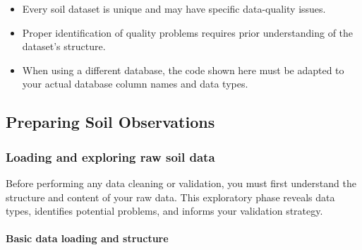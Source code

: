 \documentclass[
  10pt,
  b5paper,
  oneside]{book}
\begin{document}
\begin{itemize}
\item
  Every soil dataset is unique and may have specific data-quality issues.
\item
  Proper identification of quality problems requires prior understanding of the dataset's structure.
\item
  When using a different database, the code shown here must be adapted to your actual database column names and data types.
\end{itemize}

\subsection{Preparing Soil Observations}\label{preparing-soil-observations}

\subsubsection{Loading and exploring raw soil data}\label{loading-and-exploring-raw-soil-data}

Before performing any data cleaning or validation, you must first understand the structure and content of your raw data. This exploratory phase reveals data types, identifies potential problems, and informs your validation strategy.

\paragraph*{Basic data loading and structure}\label{basic-data-loading-and-structure}
\end{document}
